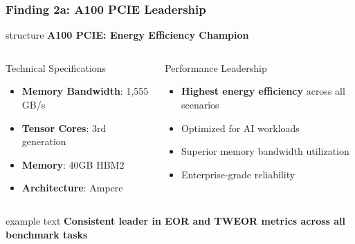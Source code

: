 \documentclass[aspectratio=169,xcolor=dvipsnames]{beamer}
\begin{document}
\begin{frame}
\frametitle{Finding 2a: A100 PCIE Leadership}

\begin{center}
\begin{beamercolorbox}[wd=0.8\textwidth,center]{structure}
\Large\textbf{A100 PCIE: Energy Efficiency Champion}
\end{beamercolorbox}
\end{center}

\vspace{0.5cm}

\begin{columns}[c]
\begin{exampleblock}{Technical Specifications}
\begin{itemize}
\item \textbf{Memory Bandwidth}: 1,555 GB/s
\item \textbf{Tensor Cores}: 3rd generation
\item \textbf{Memory}: 40GB HBM2
\item \textbf{Architecture}: Ampere
\end{itemize}
\end{exampleblock}

\begin{block}{Performance Leadership}
\begin{itemize}
\item \textbf{Highest energy efficiency} across all scenarios
\item Optimized for AI workloads
\item Superior memory bandwidth utilization
\item Enterprise-grade reliability
\end{itemize}
\end{block}

\end{columns}

\vspace{0.5cm}
\begin{center}
\begin{beamercolorbox}[wd=0.9\textwidth,center]{example text}
\textbf{Consistent leader in EOR and TWEOR metrics across all benchmark tasks}
\end{beamercolorbox}
\end{center}
\end{frame}
\end{document}
